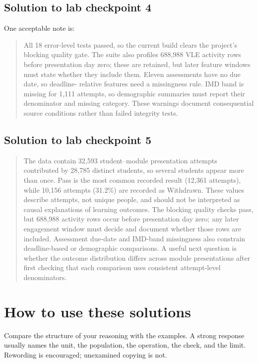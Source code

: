 \subsection{Solution to lab checkpoint 4}
\label{sol:lab-quality}

One acceptable note is:
\begin{quote}
All 18 error-level tests passed, so the current build clears the project's
blocking quality gate. The suite also profiles 688,988 VLE activity rows before
presentation day zero; these are retained, but later feature windows must state
whether they include them. Eleven assessments have no due date, so deadline-
relative features need a missingness rule. IMD band is missing for 1,111
attempts, so demographic summaries must report their denominator and missing
category. These warnings document consequential source conditions rather than
failed integrity tests.
\end{quote}

\subsection{Solution to lab checkpoint 5}
\label{sol:lab-synthesis}

\begin{quote}
The data contain 32,593 student--module presentation attempts contributed by
28,785 distinct students, so several students appear more than once. Pass is
the most common recorded result (12,361 attempts), while 10,156 attempts
(31.2\%) are recorded as Withdrawn. These values describe attempts, not unique
people, and should not be interpreted as causal explanations of learning
outcomes. The blocking quality checks pass, but 688,988 activity rows occur
before presentation day zero; any later engagement window must decide and
document whether those rows are included. Assessment due-date and IMD-band
missingness also constrain deadline-based or demographic comparisons. A useful
next question is whether the outcome distribution differs across module
presentations after first checking that each comparison uses consistent
attempt-level denominators.
\end{quote}

\section{How to use these solutions}

Compare the structure of your reasoning with the examples. A strong response
usually names the unit, the population, the operation, the check, and the
limit. Rewording is encouraged; unexamined copying is not.
